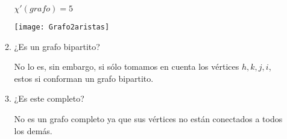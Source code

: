 \documentclass[spanish, fleqn]{article}
\begin{document}
\begin{enumerate}
\begin{enumerate}
$\chi'(grafo)= 5$

\texttt{[image: Grafo2aristas]}

\item{¿Es un grafo bipartito?}

No lo es, sin embargo, si sólo tomamos en cuenta los vértices $h,k,j,i$, estos si conforman un grafo bipartito.
\item{¿Es este completo?}

No es un grafo completo ya que sus vértices no están conectados a todos los demás.
\end{enumerate}

\end{enumerate}
\end{document}
